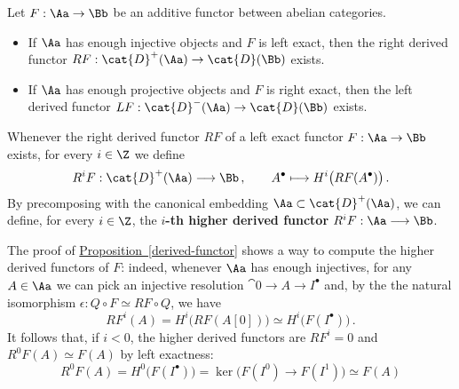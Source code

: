 \begin{cor}
    Let $F:\Aa \to \Bb$ be an additive functor between abelian categories.
    \begin{itemize}
        \item If $\Aa$ has enough injective objects and $F$ is left exact,
        then the right derived functor $RF: \cat{D}^{+}(\Aa) \to \cat{D}(\Bb)$ exists.
        \item If $\Aa$ has enough projective objects and $F$ is right exact,
        then the left derived functor $LF: \cat{D}^{-}(\Aa) \to \cat{D}(\Bb)$ exists.
    \end{itemize}
\end{cor}

\begin{df}
    Whenever the right derived functor $RF$ of a left exact functor $F:\Aa \to \Bb$ exists,
    for every $i \in \Z$ we define
    \begin{equation*}
        R^{i}F : \cat{D}^{+}(\Aa) \longrightarrow \Bb\,,
        \qquad A^{\bullet} \longmapsto H^{i}\big(RF(A^{\bullet})\big)\,.
    \end{equation*}
    By precomposing with the canonical embedding $\Aa \subset \cat{D}^{+}(\Aa)$,
    we can define, for every $i \in \Z$, the \textbf{$i$-th higher derived functor}
    $R^{i}F : \Aa \longrightarrow \Bb$.
\end{df}

The proof of \hyperref[derived-functor]{Proposition~\ref*{derived-functor}}
shows a way to compute the higher derived functors of $F$: indeed,
whenever $\Aa$ has enough injectives, for any $A \in \Aa$
we can pick an injective resolution $\cat{0} \to A \to I^{\bullet}$ and,
by the the natural isomorphism $\epsilon : Q \circ F \simeq RF \circ Q$,
we have 
\begin{equation*}
    RF^{i}(A) = H^{i}\big( RF(A[0]) \big) 
    \simeq H^{i}\big(F(I^{\bullet})\big)\,.
\end{equation*}
It follows that, if $i<0$, the higher derived functors are $RF^{i}=0$
and $R^{0}F(A) \simeq F(A)$ by left exactness:
\begin{equation*}
    R^{0}F(A) = H^{0}\big(F(I^{\bullet})\big) 
    = \ker\big(F(I^{0}) \to F(I^{1})\big) \simeq F(A)
\end{equation*}

